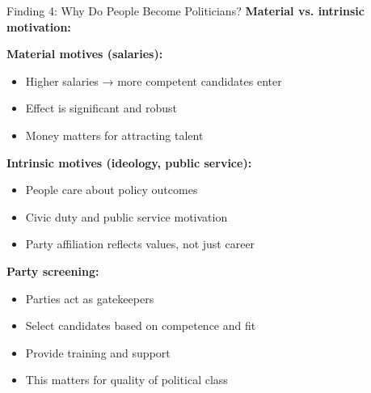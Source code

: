 \documentclass[10pt]{beamer}
\begin{document}
\begin{frame}{Finding 4: Why Do People Become Politicians?}
\textbf{Material vs. intrinsic motivation:}



\textbf{Material motives (salaries):}
\begin{itemize}
\item Higher salaries → \alert{more competent candidates} enter
\item Effect is significant and robust
\item Money matters for attracting talent
\end{itemize}



\textbf{Intrinsic motives (ideology, public service):}
\begin{itemize}
\item People care about policy outcomes
\item Civic duty and public service motivation
\item Party affiliation reflects values, not just career
\end{itemize}



\textbf{Party screening:}
\begin{itemize}
\item Parties act as gatekeepers
\item Select candidates based on competence and fit
\item Provide training and support
\item \alert{This matters for quality of political class}
\end{itemize}
\end{frame}
\end{document}
